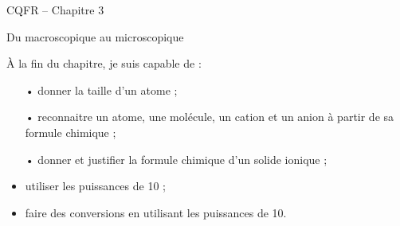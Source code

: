 \documentclass[12pt,a5paper]{article}
\begin{document}
\begin{header}
CQFR -- Chapitre 3

Du macroscopique au microscopique
\end{header}

À la fin du chapitre, je suis capable de :
\begin{itemize}
\item[•] donner la taille d'un atome ;
\item[•] reconnaitre un atome, une molécule, un cation et un anion à partir de sa formule chimique ;
\item[•] donner et justifier la formule chimique d'un solide ionique ;

\item utiliser les puissances de 10 ;
\item faire des conversions en utilisant les puissances de 10.
\end{itemize}
\end{document}

